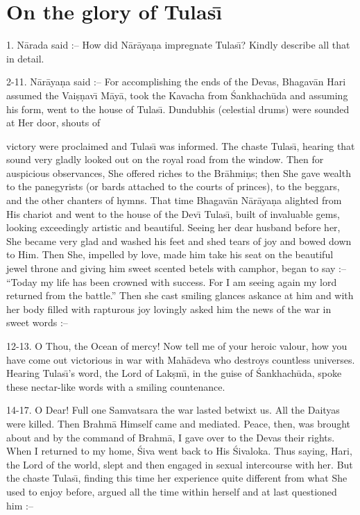 \chapter{On the glory of Tulas\={\i}}

1. N\=arada said :-- How did N\=ar\=aya\d{n}a impregnate Tulas\={\i}? Kindly describe all that in detail.

2-11. N\=ar\=aya\d{n}a said :-- For accomplishing the ends of the Devas, Bhagav\=an Hari assumed the Vai\d{s}\d{n}av\={\i} M\=ay\=a, took the Kavacha from \'Sankhach\=uda and assuming his form, went to the house of Tulas\={\i}. Dundubhis (celestial drums) were sounded at Her door, shouts of

victory were proclaimed and Tulas\={\i} was informed. The chaste Tulas\={\i}, hearing that sound very gladly looked out on the royal road from the window. Then for auspicious observances, She offered riches to the Br\=ahmi\d{n}s; then She gave wealth to the panegyrists (or bards attached to the courts of princes), to the beggars, and the other chanters of hymns. That time Bhagav\=an N\=ar\=aya\d{n}a alighted from His chariot and went to the house of the Dev\={\i} Tulas\={\i}, built of invaluable gems, looking exceedingly artistic and beautiful. Seeing her dear husband before her, She became very glad and washed his feet and shed tears of joy and bowed down to Him. Then She, impelled by love, made him take his seat on the beautiful jewel throne and giving him sweet scented betels with camphor, began to say :-- ``Today my life has been crowned with success. For I am seeing again my lord returned from the battle.'' Then she cast smiling glances askance at him and with her body filled with rapturous joy lovingly asked him the news of the war in sweet words :--

12-13. O Thou, the Ocean of mercy! Now tell me of your heroic valour, how you have come out victorious in war with Mah\=adeva who destroys countless universes. Hearing Tulas\={\i}'s word, the Lord of Lak\d{s}m\={\i}, in the guise of \'Sankhach\=uda, spoke these nectar-like words with a smiling countenance.

14-17. O Dear! Full one Samvatsara the war lasted betwixt us. All the Daityas were killed. Then Brahm\=a Himself came and mediated. Peace, then, was brought about and by the command of Brahm\=a, I gave over to the Devas their rights. When I returned to my home, \'Siva went back to His \'Sivaloka. Thus saying, Hari, the Lord of the world, slept and then engaged in sexual intercourse with her. But the chaste Tulas\={\i}, finding this time her experience quite different from what She used to enjoy before, argued all the time within herself and at last questioned him :--

